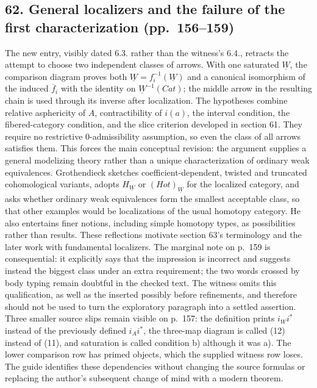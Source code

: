 \subsection*{62. General localizers and the failure of the first characterization (pp.~156--159)}
The new entry, visibly dated 6.3. rather than the witness's 6.4., retracts the attempt to choose two independent classes of arrows. With one saturated $\underline W$, the comparison diagram proves both $\underline W=f_i^{-1}(\underline W)$ and a canonical isomorphism of the induced $\overline f_i$ with the identity on $\underline W^{-1}(Cat)$; the middle arrow in the resulting chain is used through its inverse after localization. The hypotheses combine relative asphericity of $A$, contractibility of $i(a)$, the interval condition, the fibered-category condition, and the slice criterion developed in section 61. They require no restrictive 0-admissibility assumption, so even the class of all arrows satisfies them. This forces the main conceptual revision: the argument supplies a general modelizing theory rather than a unique characterization of ordinary weak equivalences. Grothendieck sketches coefficient-dependent, twisted and truncated cohomological variants, adopts $H_{\underline W}$ or $(Hot)_{\underline W}$ for the localized category, and asks whether ordinary weak equivalences form the smallest acceptable class, so that other examples would be localizations of the usual homotopy category. He also entertains finer notions, including simple homotopy types, as possibilities rather than results. These reflections motivate section 63's terminology and the later work with fundamental localizers. The marginal note on p.~159 is consequential: it explicitly says that the impression is incorrect and suggests instead the biggest class under an extra requirement; the two words crossed by body typing remain doubtful in the checked text. The witness omits this qualification, as well as the inserted possibly before refinements, and therefore should not be used to turn the exploratory paragraph into a settled assertion. Three smaller source slips remain visible on p.~157: the definition prints $i_Wi^*$ instead of the previously defined $i_Ai^*$, the three-map diagram is called (12) instead of (11), and saturation is called condition b) although it was a). The lower comparison row has primed objects, which the supplied witness row loses. The guide identifies these dependencies without changing the source formulas or replacing the author's subsequent change of mind with a modern theorem.


